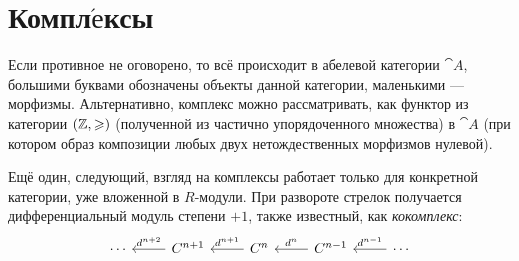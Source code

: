 \documentclass[a4paper]{report}
\begin{document}
    \section{Компл$\acute{\text{е}}$ксы}
    Если противное не оговорено, то всё происходит в абелевой категории $\cat A$, большими буквами обозначены объекты данной категории, маленькими --- морфизмы.
    Альтернативно, комплекс можно рассматривать, как функтор из категории $(\mathbb{Z}, \geqslant)$ (полученной из частично упорядоченного множества) в $\cat A$ (при котором образ композиции любых двух нетождественных морфизмов нулевой).

    Ещё один, следующий, взгляд на комплексы работает только для конкретной категории, уже вложенной в $R$-модули.
    При развороте стрелок получается дифференциальный модуль степени $+1$, также известный, как \emph{кокомплекс}:
    \[\begin{tikzcd}[ampersand replacement=\&]
          \cdots \& {C^{n+1}} \& {C^{n}} \& {C^{n-1}} \& \cdots
          \arrow["{d^{n+2}}"', from=1-2, to=1-1]
          \arrow["{d^{n+1}}"', from=1-3, to=1-2]
          \arrow["{d^n}"', from=1-4, to=1-3]
          \arrow["{d^{n-1}}"', from=1-5, to=1-4]
    \end{tikzcd}\]
\end{document}
